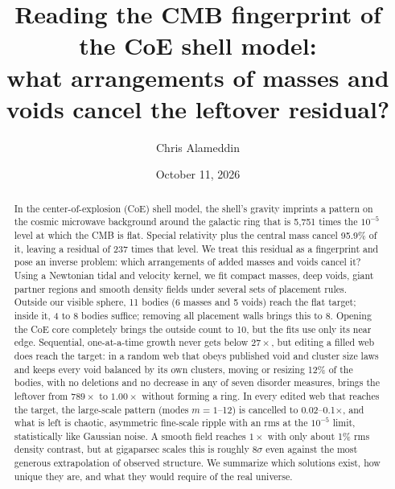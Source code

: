 \documentclass[aps,prd,twocolumn,nofootinbib,superscriptaddress,floatfix]{revtex4-2}
\begin{document}
\title{Reading the CMB fingerprint of the CoE shell model:\\ what arrangements of masses and voids cancel the leftover residual?}
\author{Chris Alameddin}
\date{October 11, 2026}
\begin{abstract}
In the center-of-explosion (CoE) shell model, the shell's gravity imprints a pattern on the cosmic microwave background around the galactic ring that is 5,751 times the $10^{-5}$ level at which the CMB is flat. Special relativity plus the central mass cancel 95.9\% of it, leaving a residual of 237 times that level. We treat this residual as a fingerprint and pose an inverse problem: which arrangements of added masses and voids cancel it? Using a Newtonian tidal and velocity kernel, we fit compact masses, deep voids, giant partner regions and smooth density fields under several sets of placement rules. Outside our visible sphere, 11 bodies (6 masses and 5 voids) reach the flat target; inside it, 4 to 8 bodies suffice; removing all placement walls brings this to 8. Opening the CoE core completely brings the outside count to 10, but the fits use only its near edge. Sequential, one-at-a-time growth never gets below $27\times$, but editing a filled web does reach the target: in a random web that obeys published void and cluster size laws and keeps every void balanced by its own clusters, moving or resizing 12\% of the bodies, with no deletions and no decrease in any of seven disorder measures, brings the leftover from $789\times$ to $1.00\times$ without forming a ring. In every edited web that reaches the target, the large-scale pattern (modes $m=1$--12) is cancelled to 0.02--0.1$\times$, and what is left is chaotic, asymmetric fine-scale ripple with an rms at the $10^{-5}$ limit, statistically like Gaussian noise. A smooth field reaches $1\times$ with only about 1\% rms density contrast, but at gigaparsec scales this is roughly $8\sigma$ even against the most generous extrapolation of observed structure. We summarize which solutions exist, how unique they are, and what they would require of the real universe.
\end{abstract}
\maketitle
\end{document}
